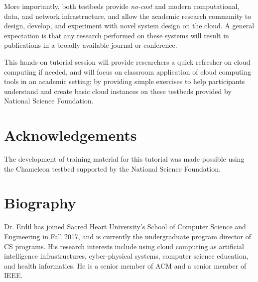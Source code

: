 \documentclass{article}
\begin{document}
More importantly, both testbeds provide \textit{no-cost} and modern computational, data, and network infrastructure, and allow the academic research community to design, develop, and experiment with novel system design on the cloud. A general expectation is that any research performed on these systems will result in publications in a broadly available journal or conference.

This hands-on tutorial session will provide researchers a quick refresher on cloud computing if needed, and will focus on classroom application of cloud computing tools in an academic setting; by providing simple exercises to help participants understand and create basic cloud instances on these testbeds provided by National Science Foundation.

\section*{Acknowledgements}
The development of training material for this tutorial was made possible using the Chameleon testbed supported by the National Science Foundation.

\section*{Biography}
Dr. Erdil has joined Sacred Heart University's School of Computer Science and Engineering in Fall 2017, and is currently the undergraduate program director of CS programs. His research interests include using cloud computing as artificial intelligence infrastructures, cyber-physical systems, computer science education, and health informatics. He is a senior member of ACM and a senior member of IEEE.

\medskip


\small{

}
\end{document}
